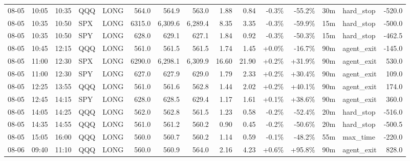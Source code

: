 \documentclass[11pt,a4paper,twoside]{article}
\begin{document}
\begin{landscape}
\begin{center}
\begin{longtable}{>{\color{txtmain}}l l l l l r r r r r r r r >{\color{txtmain}}l r}
08-05 & 10:05 & 10:35 & QQQ & LONG & 564.0 & 564.9 & 563.0 & 1.88 & 0.84 & \textcolor{lossred}{-0.3\%} & \textcolor{lossred}{-55.2\%} & 30m & hard\_stop & \textcolor{lossred}{-520.0} \\
08-05 & 10:35 & 10:50 & SPX & LONG & 6315.0 & 6,309.6 & 6,289.4 & 8.35 & 3.35 & \textcolor{lossred}{-0.3\%} & \textcolor{lossred}{-59.9\%} & 15m & hard\_stop & \textcolor{lossred}{-500.0} \\
08-05 & 10:35 & 10:50 & SPY & LONG & 628.0 & 629.1 & 627.1 & 1.84 & 0.92 & \textcolor{lossred}{-0.3\%} & \textcolor{lossred}{-50.3\%} & 15m & hard\_stop & \textcolor{lossred}{-462.5} \\
08-05 & 10:45 & 12:15 & QQQ & LONG & 561.0 & 561.5 & 561.5 & 1.74 & 1.45 & \textcolor{wingreen}{+0.0\%} & \textcolor{lossred}{-16.7\%} & 90m & agent\_exit & \textcolor{lossred}{-145.0} \\
08-05 & 11:00 & 12:30 & SPX & LONG & 6290.0 & 6,298.1 & 6,309.9 & 16.60 & 21.90 & \textcolor{wingreen}{+0.2\%} & \textcolor{wingreen}{+31.9\%} & 90m & agent\_exit & \textcolor{wingreen}{530.0} \\
08-05 & 11:00 & 12:30 & SPY & LONG & 627.0 & 627.9 & 629.0 & 1.79 & 2.33 & \textcolor{wingreen}{+0.2\%} & \textcolor{wingreen}{+30.4\%} & 90m & agent\_exit & \textcolor{wingreen}{109.0} \\
08-05 & 12:25 & 13:55 & QQQ & LONG & 561.0 & 561.6 & 562.8 & 1.44 & 2.02 & \textcolor{wingreen}{+0.2\%} & \textcolor{wingreen}{+40.1\%} & 90m & agent\_exit & \textcolor{wingreen}{174.0} \\
08-05 & 12:45 & 14:15 & SPY & LONG & 628.0 & 628.5 & 629.4 & 1.17 & 1.61 & \textcolor{wingreen}{+0.1\%} & \textcolor{wingreen}{+38.6\%} & 90m & agent\_exit & \textcolor{wingreen}{360.0} \\
08-05 & 14:05 & 14:25 & QQQ & LONG & 562.0 & 562.8 & 561.5 & 1.23 & 0.58 & \textcolor{lossred}{-0.2\%} & \textcolor{lossred}{-52.4\%} & 20m & hard\_stop & \textcolor{lossred}{-516.0} \\
08-05 & 14:35 & 14:55 & QQQ & LONG & 561.0 & 561.2 & 560.2 & 0.90 & 0.45 & \textcolor{lossred}{-0.2\%} & \textcolor{lossred}{-50.6\%} & 20m & hard\_stop & \textcolor{lossred}{-500.5} \\
08-05 & 15:05 & 16:00 & QQQ & LONG & 560.0 & 560.7 & 560.2 & 1.14 & 0.59 & \textcolor{lossred}{-0.1\%} & \textcolor{lossred}{-48.2\%} & 55m & max\_time & \textcolor{lossred}{-220.0} \\
08-06 & 09:40 & 11:10 & QQQ & LONG & 560.0 & 560.9 & 564.0 & 2.16 & 4.23 & \textcolor{wingreen}{+0.6\%} & \textcolor{wingreen}{+95.8\%} & 90m & agent\_exit & \textcolor{wingreen}{828.0} \\

\end{longtable}
\end{center}
\end{landscape}
\end{document}
